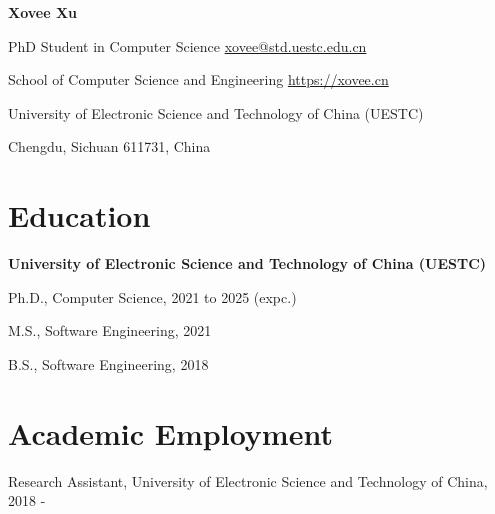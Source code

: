 \documentclass{article}
\begin{document}
\begin{center}
    \vspace*{5pt}
    \Huge{
    \textbf{Xovee Xu}}
\end{center}
\vspace{15pt}



\setlength{\parskip}{1pt}

\noindent PhD Student in Computer Science \hfill \href{mailto:xovee@std.uestc.edu.cn}{xovee@std.uestc.edu.cn}

\noindent School of Computer Science and Engineering \hfill \url{https://xovee.cn}

\noindent University of Electronic Science and Technology of China (UESTC)

\noindent Chengdu, Sichuan 611731, China


\setlength{\parskip}{3pt}

\section*{Education}
\indent 

\textbf{University of Electronic Science and Technology of China (UESTC)}

\hspace{2em}Ph.D., Computer Science, 2021 to 2025 (expc.)

\hspace{2em}M.S., Software Engineering, 2021

\hspace{2em}B.S., Software Engineering, 2018




\section*{Academic Employment}
\indent

Research Assistant, University of Electronic Science and Technology of China, 2018 -
\end{document}
